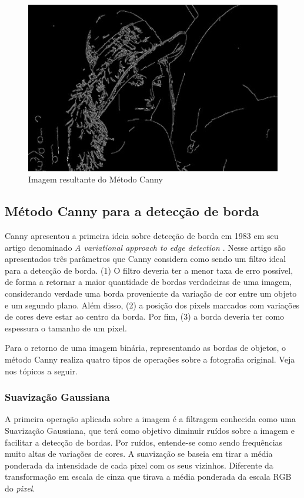 \documentclass[12pt]{article}
\begin{document}
	\begin{figure}[h!]
		\centering
		\includegraphics[width=0.7\linewidth]{img/img9}
		\caption{Imagem resultante do Método Canny}
		\label{fig:img9}
	\end{figure}
	
	
	\subsection{Método Canny para a detecção de borda}
	Canny apresentou a primeira ideia sobre detecção de borda em 1983 em seu artigo denominado \textit{A variational approach to edge detection} \citep{canny1983variational}. Nesse artigo são apresentados três parâmetros que Canny considera como sendo um filtro ideal para a detecção de borda. (1) O filtro deveria ter a menor taxa de erro possível, de forma a retornar a maior quantidade de bordas verdadeiras de uma imagem, considerando verdade uma borda proveniente da variação de cor entre um objeto e um segundo plano. Além disso, (2) a posição dos pixels marcados com variações de cores deve estar ao centro da borda. Por fim, (3) a borda deveria ter como espessura o tamanho de um pixel. 
	
	Para o retorno de uma imagem binária, representando as bordas de objetos, o método Canny realiza quatro tipos de operações sobre a fotografia original. Veja nos tópicos a seguir.  
	
	\subsubsection{Suavização Gaussiana}
	A primeira operação aplicada sobre a imagem é a filtragem conhecida como uma Suavização Gaussiana, que terá como objetivo diminuir ruídos sobre a imagem e facilitar a detecção de bordas. Por ruídos, entende-se como sendo frequências muito altas de variações de cores. A suavização se baseia em tirar a média ponderada da intensidade de cada pixel com os seus vizinhos. Diferente da transformação em escala de cinza que tirava a média ponderada da escala RGB do \textit{pixel}.  
	
\end{document}
